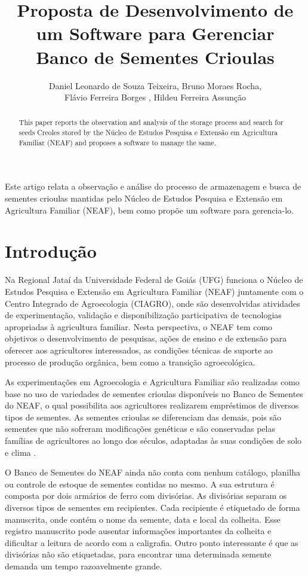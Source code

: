 \documentclass[12pt,a4paper]{article}
\title{Proposta de Desenvolvimento de um Software para Gerenciar\\  Banco de Sementes Crioulas}
\author{Daniel Leonardo de Souza Teixeira\inst{1}, Bruno Moraes Rocha\inst{2}, \\Flávio Ferreira Borges\inst{3} , Hildeu Ferreira Assunção \inst{4}}
\begin{document}
 

\maketitle

\begin{abstract}
This paper reports the observation and analysis of the storage process and search for seeds
Creoles stored by the Núcleo de Estudos Pesquisa e Extensão em Agricultura Familiar (NEAF)
and proposes a software to manage the same.

\end{abstract}
     
\begin{resumo} 

Este artigo relata a observação e análise do processo de armazenagem e busca de sementes
crioulas mantidas pelo Núcleo de Estudos Pesquisa e Extensão em Agricultura Familiar (NEAF), bem como propõe um software para gerencia-lo.\\


\end{resumo}


\section{Introdução}

Na Regional Jataí da Universidade Federal de Goiás (UFG) funciona o Núcleo de Estudos Pesquisa e Extensão em Agricultura Familiar (NEAF) juntamente com o Centro Integrado de Agroecologia (CIAGRO), onde são desenvolvidas atividades de experimentação, validação e disponibilização participativa de tecnologias apropriadas à agricultura familiar. Nesta perspectiva, o NEAF tem como objetivos o desenvolvimento de pesquisas, ações de ensino e de extensão para oferecer aos agricultores interessados, as condições técnicas de suporte ao processo de produção orgânica, bem como a transição agroecológica. 

As experimentações em Agroecologia e Agricultura Familiar são realizadas como base no uso de variedades de sementes crioulas disponíveis no Banco de Sementes do NEAF, o qual possibilita aos agricultores realizarem empréstimos de diversos tipos de sementes. As sementes crioulas se diferenciam das demais, pois são sementes que não sofreram modificações genéticas e são conservadas pelas famílias de agricultores ao longo dos séculos, adaptadas às suas condições de solo e clima \cite{pelwing2008sementes}.

 O Banco de Sementes do NEAF ainda não conta com nenhum catálogo, planilha ou controle de estoque de sementes contidas no mesmo. A sua estrutura é composta por dois armários de ferro com divisórias. As divisórias separam os diversos tipos de sementes em recipientes. Cada recipiente é etiquetado de forma manuscrita, onde contém o nome da semente, data e local da colheita. Esse registro manuscrito pode ausentar informações importantes da colheita e dificultar a leitura de acordo com a caligrafia. Outro ponto interessante é que as divisórias não são etiquetadas, para encontrar uma determinada semente demanda um tempo razoavelmente grande. 
\end{document}
